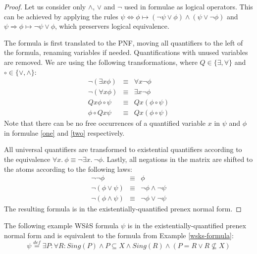 	\begin{proof}
Let us consider only $\wedge$, $\vee$ and $\neg$ used in formulae as logical
operators. This can be achieved by applying the rules $\psi \Leftrightarrow \phi
\mapsto (\neg \psi \vee \phi) \wedge (\psi \vee \neg \phi)$ and $\psi
\Rightarrow \phi \mapsto \neg \psi \vee \phi$, which preservers logical
equivalence.
	
The formula is first translated to the PNF, moving all quantifiers to the left
of the formula, renaming variables if needed. Quantifications with unused
variables are removed. We are using the following transformations, where $Q \in
\{\exists, \forall\}$ and $\circ \in \{\vee, \wedge\}$:
	\begin{eqnarray}
	 \neg(\exists x \phi) & \equiv & \forall x\neg \phi\\
	 \neg(\forall x \phi) & \equiv & \exists x\neg \phi\\
	 Qx\phi \circ \psi & \equiv & Qx(\phi \circ \psi)\label{one}\\
	 \phi \circ Qx\psi & \equiv & Qx(\phi \circ \psi)\label{two}
	\end{eqnarray}
Note that there can be no free occurrences of a quantified variable $x$ in
$\psi$ and $\phi$ in formulae \ref{one} and \ref{two} respectively.
	
All universal quantifiers are transformed to existential quantifiers
according to the equivalence $\forall x.\ \phi \equiv \neg\exists x.\ \neg\phi$.
Lastly, all negations in the matrix are shifted to the atoms according to the
following laws:
	\begin{eqnarray}
	 \neg\neg\phi & \equiv & \phi\\
	 \neg(\phi\vee \psi) & \equiv & \neg \phi \wedge \neg \psi\\
	 \neg(\phi\wedge \psi) & \equiv & \neg \phi \vee \neg \psi 
	\end{eqnarray}
 The resulting formula is in the existentially-quantified prenex normal form. 
	\end{proof}
	
	  \noindent\hrulefill
  \begin{example}
  The following example WS$k$S formula $\psi$ is in the existentially-quantified
  prenex normal form and is equivalent to the formula from Example
  \ref{wsks-formula}:
  \begin{equation}
   \psi \overset{\mathit{def}}{=} \exists P: \forall R: \mathit{Sing}(P) \wedge
   P \subseteq X \wedge \mathit{Sing}(R) \wedge (P = R \vee R \not\subseteq X)
  \end{equation}
   \hrulefill
  \end{example}\label{wsks-formula-existential}
	
